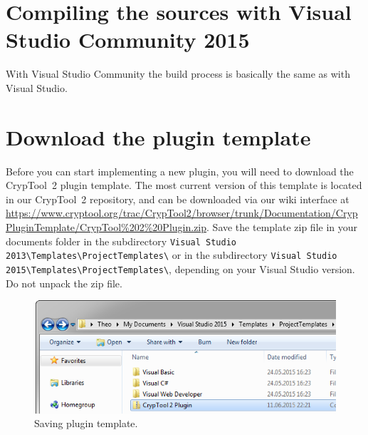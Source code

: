 \section{Compiling the sources with Visual Studio Community 2015}
\label{CompilingTheSourcesExpress}

With Visual Studio Community the build process is basically the same as with Visual Studio.

\section{Download the plugin template}
\label{DownloadingThePluginTemplate}

Before you can start implementing a new plugin, you will need to download the CrypTool~2 plugin template. The most current version of this template is located in our CrypTool~2 repository, and can be downloaded via our wiki interface at \url{https://www.cryptool.org/trac/CrypTool2/browser/trunk/Documentation/CrypPluginTemplate/CrypTool\%202\%20Plugin.zip}. Save the template zip file in your documents folder in the subdirectory \texttt{Visual Studio 2013\textbackslash{}Templates\textbackslash{}ProjectTemplates\textbackslash{}} or in the subdirectory \texttt{Visual Studio 2015\textbackslash{}Templates\textbackslash{}ProjectTemplates\textbackslash{}}, depending on your Visual Studio version. Do not unpack the zip file.

\begin{figure}[htbp]
	\centering
		\includegraphics{figures/vs_template.png}
	\caption{Saving plugin template.}
	\label{fig:vs_template}
\end{figure}
\clearpage
